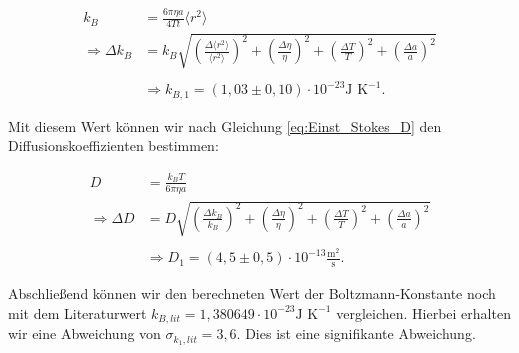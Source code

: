 \documentclass{article}
\begin{document}
\begin{equation}
    \begin{split}
            k_B &= \frac{6 \pi \eta a}{4 T t} \langle r^2 \rangle \\
            \Rightarrow \Delta k_B &= k_B \sqrt{\left( \frac{\Delta \langle r^2 \rangle}{\langle r^2 \rangle} \right)^2 + \left( \frac{\Delta \eta}{\eta} \right)^2 +\left( \frac{\Delta T}{T} \right)^2 +\left( \frac{\Delta a}{a} \right)^2} \\ \\
            &\Rightarrow k_{B,1} = (1,03 \pm 0,10) \cdot 10^{-23} \text{J K}^{-1}.
    \end{split}
\end{equation}

Mit diesem Wert können wir nach Gleichung \ref{eq:Einst_Stokes_D} den Diffusionskoeffizienten bestimmen:

\begin{equation}
    \begin{split}
        D &= \frac{k_B T}{6 \pi \eta a} \\
        \Rightarrow \Delta D &= D \sqrt{\left( \frac{\Delta k_B}{k_B} \right)^2 + \left( \frac{\Delta \eta}{\eta} \right)^2 +\left( \frac{\Delta T}{T} \right)^2 +\left( \frac{\Delta a}{a} \right)^2} \\ \\
        &\Rightarrow D_1 = (4,5 \pm 0,5) \cdot 10^{-13} \frac{\text{m}^2}{\text{s}}.
    \end{split}
\end{equation}

Abschließend können wir den berechneten Wert der Boltzmann-Konstante noch mit dem Literaturwert $k_{B,lit} = 1,380649 \cdot 10^{-23} \text{J K}^{-1}$ vergleichen. Hierbei erhalten wir eine Abweichung von $\sigma_{k_1,lit} = 3,6$. Dies ist eine signifikante Abweichung. 
\end{document}
